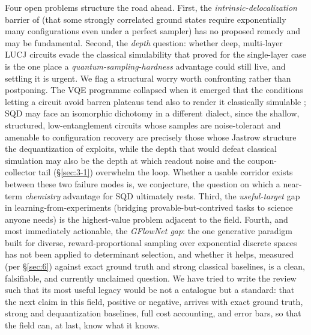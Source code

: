 \documentclass[onecolumn,a4paper]{quantumarticle}
\begin{document}
Four open problems structure the road ahead. First, the \emph{intrinsic-delocalization} barrier of \cite{gaberle2026} (that some strongly correlated ground states require exponentially many configurations even under a perfect sampler) has no proposed remedy and may be fundamental. Second, the \emph{depth} question: whether deep, multi-layer LUCJ circuits evade the classical simulability that \cite{belagali2026} proved for the single-layer case is the one place a \emph{quantum-sampling-hardness} advantage could still live, and settling it is urgent. We flag a structural worry worth confronting rather than postponing. The VQE programme collapsed when it emerged that the conditions letting a circuit avoid barren plateaus tend also to render it classically simulable \cite{cerezo2025}; SQD may face an isomorphic dichotomy in a different dialect, since the shallow, structured, low-entanglement circuits whose samples are noise-tolerant and amenable to configuration recovery are precisely those whose Jastrow structure the dequantization of \cite{belagali2026} exploits, while the depth that would defeat classical simulation may also be the depth at which readout noise and the coupon-collector tail (\S\ref{sec:3-1}) overwhelm the loop. Whether a usable corridor exists between these two failure modes is, we conjecture, the question on which a near-term \emph{chemistry} advantage for SQD ultimately rests. Third, the \emph{useful-target} gap in learning-from-experiments (bridging provable-but-contrived tasks to science anyone needs) is the highest-value problem adjacent to the field. Fourth, and most immediately actionable, the \emph{GFlowNet gap}: the one generative paradigm built for diverse, reward-proportional sampling over exponential discrete spaces has not been applied to determinant selection, and whether it helps, measured (per \S\ref{sec:6}) against exact ground truth and strong classical baselines, is a clean, falsifiable, and currently unclaimed question. We have tried to write the review such that its most useful legacy would be not a catalogue but a standard: that the next claim in this field, positive or negative, arrives with exact ground truth, strong and dequantization baselines, full cost accounting, and error bars, so that the field can, at last, know what it knows.
\end{document}
